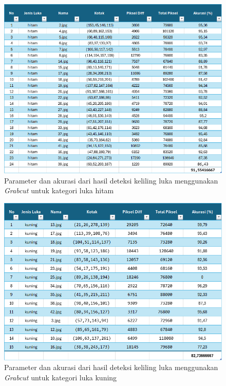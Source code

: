 \begin{figure}[H]
	\centering
	\includegraphics[width=1\textwidth]{gambar/result_table_hitam.png}
	\caption{Parameter dan akurasi dari hasil deteksi keliling luka menggunakan \emph{Grabcut} untuk kategori luka hitam}
	\label{img:result_hitam}
\end{figure}

\begin{figure}[H]
	\centering
	\includegraphics[width=1\textwidth]{gambar/result_table_kuning.png}
	\caption{Parameter dan akurasi dari hasil deteksi keliling luka menggunakan \emph{Grabcut} untuk kategori luka kuning}
	\label{img:result_kuning}
\end{figure}

